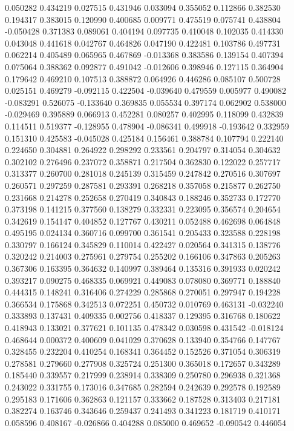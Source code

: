 0.050282
0.434219
0.027515
0.431946
0.033094
0.355052
0.112866
0.382530
0.194317
0.383015
0.120990
0.400685
0.009771
0.475519
0.075741
0.438804
-0.050428
0.371383
0.089061
0.404194
0.097735
0.410048
0.102035
0.414330
0.043048
0.441618
0.042767
0.464826
0.047190
0.422481
0.103786
0.497731
0.062214
0.405489
0.065965
0.467869
-0.013368
0.383586
0.139154
0.407394
0.075064
0.388362
0.092877
0.491042
-0.012606
0.398946
0.127115
0.364904
0.179642
0.469210
0.107513
0.388872
0.064926
0.446286
0.085107
0.500728
0.025151
0.469279
-0.092115
0.422504
-0.039640
0.479559
0.005977
0.490082
-0.083291
0.526075
-0.133640
0.369835
0.055534
0.397174
0.062902
0.538000
-0.029469
0.395889
0.066913
0.452281
0.080257
0.402995
0.118099
0.432839
0.114511
0.519377
-0.128955
0.478904
-0.086341
0.499918
-0.193642
0.332959
0.151310
0.425583
-0.045028
0.425184
0.156461
0.388784
0.107794
0.222140
0.224650
0.304881
0.264922
0.298292
0.233561
0.204797
0.314054
0.304632
0.302102
0.276496
0.237072
0.358871
0.217504
0.362830
0.122022
0.257717
0.313377
0.260700
0.281018
0.245139
0.315459
0.247842
0.270516
0.307697
0.260571
0.297259
0.287581
0.293391
0.268218
0.357058
0.215877
0.262750
0.231668
0.214278
0.252658
0.270419
0.340843
0.188246
0.352733
0.172770
0.373198
0.141215
0.377560
0.138279
0.332331
0.223095
0.356574
0.204654
0.342619
0.154147
0.404852
0.127767
0.430211
0.052488
0.462698
0.064848
0.495195
0.024134
0.360716
0.099700
0.361541
0.205433
0.323588
0.228198
0.330797
0.166124
0.345829
0.110014
0.422427
0.020564
0.341315
0.138776
0.320242
0.214003
0.275961
0.279754
0.255202
0.166106
0.347863
0.205263
0.367306
0.163395
0.364632
0.140997
0.389464
0.135316
0.391933
0.020242
0.393217
0.090275
0.468335
0.069921
0.449083
0.078080
0.369771
0.188840
0.444315
0.148241
0.316406
0.274229
0.285868
0.270051
0.297947
0.194228
0.366534
0.175868
0.342513
0.072251
0.450732
0.010769
0.463131
-0.032240
0.333893
0.137431
0.409335
0.002756
0.418337
0.129395
0.316768
0.180622
0.418943
0.133021
0.377621
0.101135
0.478342
0.030598
0.431542
-0.018124
0.468644
0.000372
0.400609
0.041029
0.370628
0.133940
0.354766
0.147767
0.328455
0.232204
0.410254
0.168341
0.364452
0.152526
0.371054
0.306319
0.278581
0.279660
0.277908
0.325724
0.251300
0.365018
0.172657
0.343289
0.185440
0.339557
0.217999
0.238914
0.338309
0.250780
0.296938
0.321368
0.243022
0.331755
0.173016
0.347685
0.282594
0.242639
0.292578
0.192589
0.295183
0.171606
0.362863
0.121157
0.333662
0.187528
0.313403
0.217181
0.382274
0.163746
0.343646
0.259437
0.241493
0.341223
0.181719
0.410171
0.058596
0.408167
-0.026866
0.404288
0.085000
0.469652
-0.090542
0.446054
